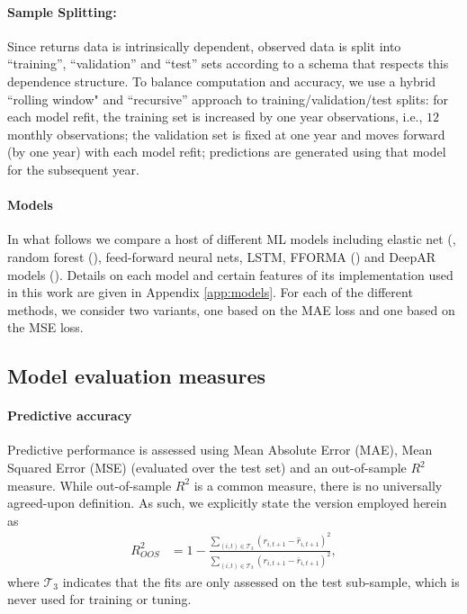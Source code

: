 \documentclass{article}
\begin{document}
\paragraph{Sample Splitting:} Since returns data is intrinsically dependent, observed data is split into ``training”, ``validation'' and ``test'' sets according to a schema that respects this dependence structure. To balance computation and accuracy, we use a  hybrid ``rolling window"  and ``recursive'' approach to training/validation/test splits: for each model refit, the training set is increased by one year observations, i.e., $12$ monthly observations; the validation set is fixed at one year and moves forward (by one year) with each model refit; predictions are generated using that model for the subsequent year.


\paragraph{Models} In what follows we compare a host of different ML models including elastic net (\cite{zou_regularization_2005}, random forest (\cite{breiman_random_2001}), feed-forward neural nets, LSTM, FFORMA (\cite{montero2020fforma}) and DeepAR models (\cite{salinas2019deepar}). Details on each model and certain features of its implementation used in this work are given in Appendix \ref{app:models}. For each of the different methods, we consider two variants, one based on the MAE loss and one based on the MSE loss. 

\subsection{Model evaluation measures}
\paragraph{Predictive accuracy}

Predictive performance is assessed using Mean Absolute Error (MAE), Mean Squared Error (MSE) (evaluated over the test set) and an out-of-sample $R^2$ measure. While  out-of-sample $R^2$ is a common measure, there is no universally agreed-upon definition. As such, we explicitly state the version employed herein as
\begin{align}
R^2_{OOS} &= 1 - \frac{\sum_{(i, t)\in\mathcal{T}_3}(r_{i, t+1} - \widehat{r}_{i, t+1})^2}
{\sum_{(i, t)\in\mathcal{T}_3} \left( r_{i, t+1} - \bar{r}_{i, t+1} \right) ^2},
\end{align}
where $\mathcal{T}_3$ indicates that the fits are only assessed on the test sub-sample, which is never used for training or tuning.
\end{document}
